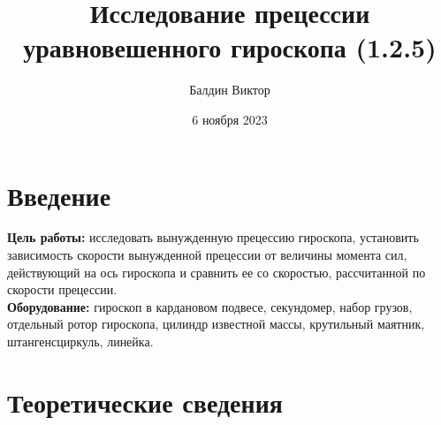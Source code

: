 \documentclass[a4paper,12pt]{article}
\title{\textbf{Исследование прецессии уравновешенного гироскопа (1.2.5)}}
\author{Балдин Виктор}
\date{6 ноября 2023}
\begin{document}
	\maketitle

	\section{Введение}

	\textbf{Цель работы:} исследовать вынужденную прецессию гироскопа, установить зависимость скорости вынужденной прецессии от величины момента сил, действующий на ось гироскопа и сравнить ее со скоростью, рассчитанной по скорости прецессии.\\
	\textbf{Оборудование:} гироскоп в кардановом подвесе, секундомер, набор грузов, отдельный ротор гироскопа, цилиндр известной массы, крутильный маятник, штангенсциркуль, линейка.

	\section{Теоретические сведения}
\end{document}
